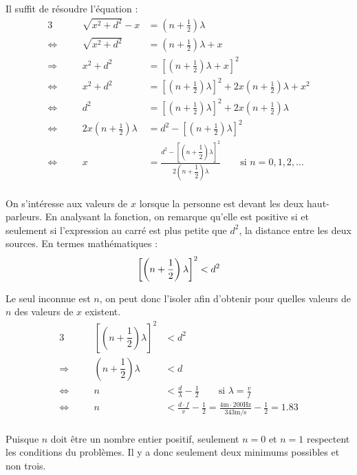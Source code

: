 \documentclass[11pt]{article}
\numberwithin{equation}{section}
\begin{document}
Il suffit de résoudre l'équation :
\begin{alignat*}{3}
	                     & & \sqrt{x^2+d^2}-x&=\left (n+\frac{1}{2}\right )\lambda\\
	\Leftrightarrow\quad & & \sqrt{x^2+d^2}  &=\left (n+\frac{1}{2}\right )\lambda+x\\
	\Rightarrow\quad     & &       x^2+d^2   &=\left [\left (n+\frac{1}{2}\right )\lambda+x\right ]^2\\
    \Leftrightarrow\quad & &       x^2+d^2   &=\left [\left (n+\frac{1}{2}\right )\lambda\right ]^2+2x\left (n+\frac{1}{2}\right )\lambda+x^2\\
    \Leftrightarrow\quad & &       d^2       &=\left [\left (n+\frac{1}{2}\right )\lambda\right ]^2+2x\left (n+\frac{1}{2}\right )\lambda\\
    \Leftrightarrow\quad & & 2x\left (n+\frac{1}{2}\right )\lambda&=d^2-\left [\left (n+\frac{1}{2}\right )\lambda\right ]^2\\
    \Leftrightarrow\quad & & x &=\frac{d^2-\left [\left (n+\dfrac{1}{2}\right )\lambda\right ]^2}{2\left (n+\dfrac{1}{2}\right )\lambda}\quad\quad\text{si $n=0,1,2,...$}\\
\end{alignat*}

On s'intéresse aux valeurs de $x$ lorsque la personne est devant les deux haut-parleurs. En analysant la fonction, on remarque qu'elle est positive si et seulement si l'expression au carré est plus petite que $d^2$, la distance entre les deux sources. En termes mathématiques :
\begin{equation*}
	\left [\left (n+\dfrac{1}{2}\right )\lambda\right ]^2<d^2\\
\end{equation*}

Le seul inconnue est $n$, on peut donc l'isoler afin d'obtenir pour quelles valeurs de $n$ des valeurs de $x$ existent.
\begin{alignat*}{3}
	                     & & \left [\left (n+\dfrac{1}{2}\right )\lambda\right ]^2&<d^2\\
	\Rightarrow\quad     & &        \left (n+\dfrac{1}{2}\right )\lambda          &<d\\
	\Leftrightarrow\quad & &               n                                      &<\frac{d}{\lambda}-\frac{1}{2}\quad\quad\text{si $\lambda=\frac{v}{f}$}\\
	\Leftrightarrow\quad & &               n                                      &<\frac{d\cdot f}{v}-\frac{1}{2}=\frac{4\mathrm{m}\cdot 200\mathrm{Hz}}{343\mathrm{m/s}}-\frac{1}{2}=1.83\\
\end{alignat*}

Puisque $n$ doit être un nombre entier positif, seulement $n=0$ et $n=1$ respectent les conditions du problèmes. Il y a donc seulement deux minimums possibles et non trois.
\end{document}

